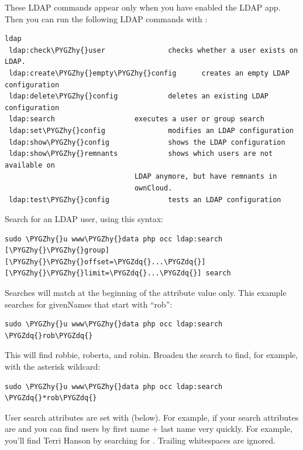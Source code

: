 \documentclass[letterpaper,10pt,english]{sphinxmanual}
\def\PYGZhy{\char`\-}
\def\PYGZdq{\char`\"}
\begin{document}
These LDAP commands appear only when you have enabled the LDAP app. Then
you can run the following LDAP commands with :

\begin{Verbatim}[commandchars=\\\{\}]
ldap
 ldap:check\PYGZhy{}user               checks whether a user exists on LDAP.
 ldap:create\PYGZhy{}empty\PYGZhy{}config      creates an empty LDAP configuration
 ldap:delete\PYGZhy{}config            deletes an existing LDAP configuration
 ldap:search                   executes a user or group search
 ldap:set\PYGZhy{}config               modifies an LDAP configuration
 ldap:show\PYGZhy{}config              shows the LDAP configuration
 ldap:show\PYGZhy{}remnants            shows which users are not available on
                               LDAP anymore, but have remnants in
                               ownCloud.
 ldap:test\PYGZhy{}config              tests an LDAP configuration
\end{Verbatim}

Search for an LDAP user, using this syntax:

\begin{Verbatim}[commandchars=\\\{\}]
sudo \PYGZhy{}u www\PYGZhy{}data php occ ldap:search [\PYGZhy{}\PYGZhy{}group] [\PYGZhy{}\PYGZhy{}offset=\PYGZdq{}...\PYGZdq{}]
[\PYGZhy{}\PYGZhy{}limit=\PYGZdq{}...\PYGZdq{}] search
\end{Verbatim}

Searches will match at the beginning of the attribute value only. This example
searches for givenNames that start with ``rob'':

\begin{Verbatim}[commandchars=\\\{\}]
sudo \PYGZhy{}u www\PYGZhy{}data php occ ldap:search \PYGZdq{}rob\PYGZdq{}
\end{Verbatim}

This will find robbie, roberta, and robin. Broaden the search to find, for
example,  with the asterisk wildcard:

\begin{Verbatim}[commandchars=\\\{\}]
sudo \PYGZhy{}u www\PYGZhy{}data php occ ldap:search \PYGZdq{}*rob\PYGZdq{}
\end{Verbatim}

User search attributes are set with 
(below). For example, if your search attributes are
 and  you can find users by first name + last name very
quickly. For example, you'll find Terri Hanson by searching for .
Trailing whitespaces are ignored.
\end{document}
